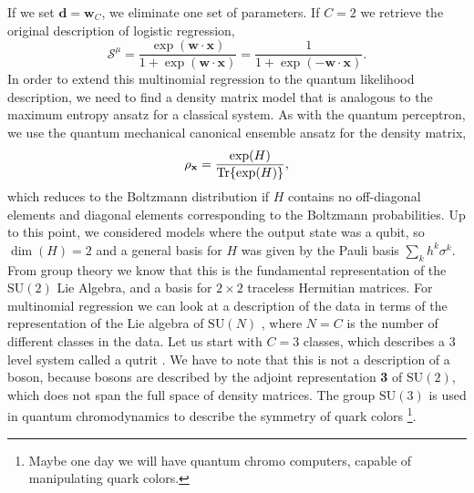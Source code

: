 If we set $\mathbf{d} = \mathbf{w}_C$, we eliminate one set of parameters. If $C=2$ we retrieve the original description of logistic regression,
\begin{equation*}
     \mathcal{S}^\mu = \frac{\exp(\mathbf{w}\cdot\mathbf{x})}{1 + \exp(\mathbf{w}\cdot\mathbf{x})} = \frac{1}{1 + \exp(-\mathbf{w}\cdot\mathbf{x})}.
\end{equation*}
In order to extend this multinomial regression to the quantum likelihood description, we need to find a density matrix model that is analogous to the maximum entropy ansatz for a classical system. As with the quantum perceptron, we use the quantum mechanical canonical ensemble ansatz for the density matrix,
\begin{equation}
    \rho_\mathbf{x} = \frac{\exp(H)}{\Tr{\exp(H)}} \label{eq:density_su3},
\end{equation}
which reduces to the Boltzmann distribution if $H$ contains no off-diagonal elements and diagonal elements corresponding to the Boltzmann probabilities. Up to this point, we considered models where the output state was a qubit, so $\dim(H)=2$ and a general basis for $H$ was given by the Pauli basis $\sum_k h^k \sigma^k$. From group theory we know that this is the fundamental representation of the $\text{SU}(2)$ Lie Algebra, and a basis for $2\times2$ traceless Hermitian matrices. For multinomial regression we can look at a description of the data in terms of the representation of the Lie algebra of $\text{SU}(N)$ , where $N=C$ is the number of different classes in the data. Let us start with $C=3$ classes, which describes a 3 level system called a qutrit \cite{Nisbet-Jones2013}. We have to note that this is not a description of a boson, because bosons are described by the adjoint representation \textbf{3} of $\text{SU}(2)$, which does not span the full space of density matrices. The group $\text{SU}(3)$ is used in quantum chromodynamics to describe the symmetry of quark colors \footnote{Maybe one day we will have quantum chromo computers, capable of manipulating quark colors.}. \newline

